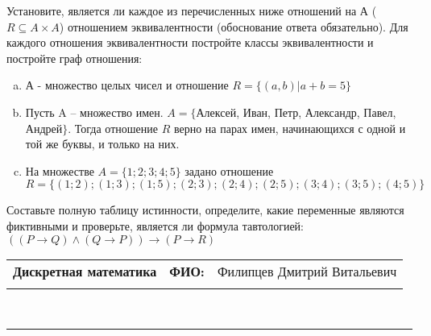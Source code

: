\documentclass[10pt]{exam}
\newcommand{\class}{Дискретная математика}
\newcommand{\examdate}{}
\begin{document}
\begin{questions}
\question
Установите, является ли каждое из перечисленных ниже отношений на А ($R \subseteq A \times A$) отношением эквивалентности (обоснование ответа обязательно). Для каждого отношения эквивалентности постройте классы 
эквивалентности и постройте граф отношения:
\begin{enumerate} [a)]\setcounter{enumi}{0}
\item А - множество целых чисел и отношение $R = \{(a,b)|a + b = 5\}$
\item Пусть A – множество имен. $A = \{ $Алексей, Иван, Петр, Александр, Павел, Андрей$ \}$. Тогда отношение $R $ верно на парах имен, начинающихся с одной и той же буквы, и только на них.
\item На множестве $A = \{1; 2; 3; 4; 5\}$ задано отношение $R = \{(1; 2); (1; 3); (1; 5); (2; 3); (2; 4); (2; 5); (3; 4); (3; 5); (4; 5)\}$
\end{enumerate}\question Составьте полную таблицу истинности, определите, какие переменные являются фиктивными и проверьте, является ли формула тавтологией:
$(( P \rightarrow Q) \land (Q \rightarrow P)) \rightarrow (P \rightarrow R)$

\end{questions}
\newpage
\begin{flushright}
\begin{tabular}{p{2.8in} r l}
\textbf{\class} & \textbf{ФИО:} &Филипцев Дмитрий Витальевич
\\

\textbf{\examdate} &&\\
\end{tabular}\\
\end{flushright}
\rule[1ex]{\textwidth}{.1pt}
\end{document}
